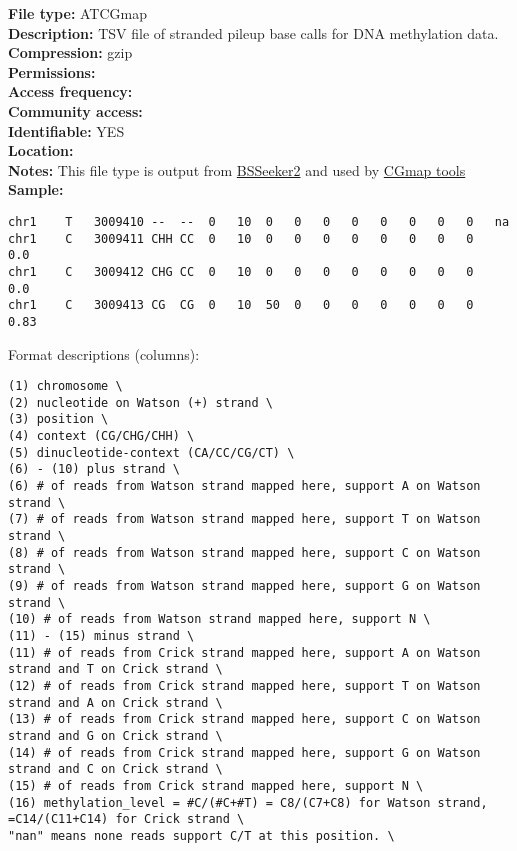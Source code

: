 \documentclass[
]{book}
\begin{document}
\textbf{File type:} ATCGmap\\
\textbf{Description:} TSV file of stranded pileup base calls for DNA methylation data.\\
\textbf{Compression:} gzip\\
\textbf{Permissions:}\\
\textbf{Access frequency:}\\
\textbf{Community access:}\\
\textbf{Identifiable:} YES\\
\textbf{Location:}\\
\textbf{Notes:} This file type is output from \href{https://github.com/BSSeeker/BSseeker2}{BSSeeker2} and used by \href{https://cgmaptools.github.io/}{CGmap tools}\\
\textbf{Sample:}

\begin{verbatim}
chr1    T   3009410 --  --  0   10  0   0   0   0   0   0   0   0   na
chr1    C   3009411 CHH CC  0   10  0   0   0   0   0   0   0   0   0.0
chr1    C   3009412 CHG CC  0   10  0   0   0   0   0   0   0   0   0.0
chr1    C   3009413 CG  CG  0   10  50  0   0   0   0   0   0   0   0.83
\end{verbatim}

Format descriptions (columns):

\begin{verbatim}
(1) chromosome \
(2) nucleotide on Watson (+) strand \
(3) position \
(4) context (CG/CHG/CHH) \
(5) dinucleotide-context (CA/CC/CG/CT) \
(6) - (10) plus strand \
(6) # of reads from Watson strand mapped here, support A on Watson strand \
(7) # of reads from Watson strand mapped here, support T on Watson strand \
(8) # of reads from Watson strand mapped here, support C on Watson strand \
(9) # of reads from Watson strand mapped here, support G on Watson strand \
(10) # of reads from Watson strand mapped here, support N \
(11) - (15) minus strand \
(11) # of reads from Crick strand mapped here, support A on Watson strand and T on Crick strand \
(12) # of reads from Crick strand mapped here, support T on Watson strand and A on Crick strand \
(13) # of reads from Crick strand mapped here, support C on Watson strand and G on Crick strand \
(14) # of reads from Crick strand mapped here, support G on Watson strand and C on Crick strand \
(15) # of reads from Crick strand mapped here, support N \
(16) methylation_level = #C/(#C+#T) = C8/(C7+C8) for Watson strand, =C14/(C11+C14) for Crick strand \
"nan" means none reads support C/T at this position. \
\end{verbatim}
\end{document}
